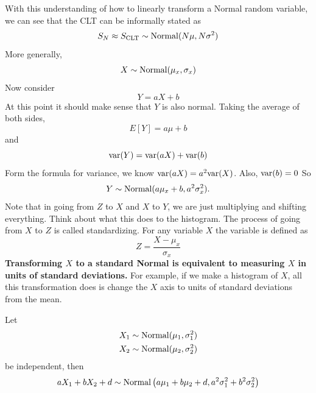 With this understanding of how to linearly transform a Normal random variable, we can see that the CLT can be informally stated as
\begin{equation*}
S_N \approx S_{\rm CLT} \sim {\rm Normal}(N\mu,N\sigma^2)
\end{equation*}
 More generally, 
\begin{equation*}
X \sim {\rm Normal}(\mu_x,\sigma_x)
\end{equation*}
Now consider 
\begin{equation*}\label{eq:linear}
Y = aX + b 
\end{equation*}
At this point it should make sense that $Y$ is also normal.  Taking the average of both sides, 
\begin{equation*}
E[Y] = a\mu + b
\end{equation*}
and 
\begin{equation*}
{\rm var}(Y) = {\rm var}(aX) + {\rm var}(b)
\end{equation*}
Form the formula for variance, we know ${\rm var}(aX)  = a^2{\rm var}(X)$. Also, ${\rm var}(b) =0$
So 
\begin{equation*}\label{eq:normal_linear_trans}
Y \sim {\rm Normal}(a\mu_x + b,a^2\sigma_x^2).
\end{equation*}
Note that in going from $Z$ to $X$ and $X$ to $Y$, we are just multiplying and shifting everything.
Think about what this does to the histogram. 
 The process of going from $X$ to $Z$ is called standardizing. For any variable $X$ the  variable is defined as 
\begin{equation*}
Z = \frac{X-\mu_x}{\sigma_x}
\end{equation*}
 {\bf Transforming $X$ to a standard Normal is equivalent to measuring $X$ in units of standard deviations.} For example, if we make a histogram of $X$, all this transformation does is change the $X$ axis to units of standard deviations from the mean. 

  \begin{thm}\label{thm:addingnormal}
Let
\begin{align*}
X_1 &\sim {\rm Normal}(\mu_1,\sigma_1^2)\\
X_2 &\sim {\rm Normal}(\mu_2,\sigma_2^2)
\end{align*}
be independent, then 
\begin{equation*}
aX_1+bX_2 + d \sim {\rm Normal}\left(a\mu_1+b\mu_2+d,a^2\sigma_1^2 + b^2\sigma_2^2\right)
\end{equation*}
 \end{thm}

